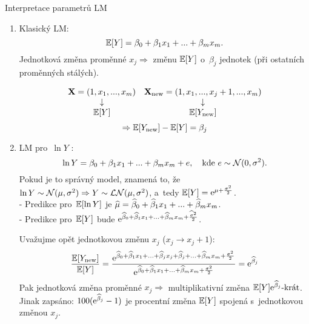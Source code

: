 \begin{remark}
Interpretace parametrů LM

\begin{enumerate}
\item Klasický LM:
 $$
 \mathbb{E} [Y] = \beta_0 + \beta_1 x_1 +... + \beta_m x_m.
 $$
Jednotková změna proměnné $x_j \Rightarrow$ změnu $\mathbb{E} [Y]$ o~$\beta_j$ jednotek (při ostatních proměnných stálých).

 $$
\begin{matrix}
\mathbf{X} = (1,x_1,...,x_m) & \mathbf{X}_{\text{new}} = (1,x_1,...,x_j+1,...,x_m) \\
\downarrow &  \downarrow \\
\mathbb{E} [Y] & \mathbb{E} [Y_{\text{new}}] \\
\end{matrix}
 $$
 \vspace{0.3cm}
 $$ \Rightarrow \mathbb{E} [Y_{\text{new}}] - \mathbb{E} [Y] = \beta_j $$
\item LM pro~$\ln Y$ :
 $$
 \ln Y = \beta_0 + \beta_1 x_1 +... + \beta_m x_m + e, \quad \text{kde } e \sim \mathcal{N}(0,\sigma^2).
 $$
Pokud je to správný model, znamená to, že $\ln Y \sim \mathcal{N}(\mu,\sigma^2) \Rightarrow Y \sim \mathcal{LN}(\mu,\sigma^2)$, a~tedy $\mathbb{E}[Y] = \mathrm{e}^{\mu + \frac{\sigma^2}{2}}$. \\
- Predikce pro~$\mathbb{E} [\ln Y]$ je $\widehat{\mu} = \widehat{\beta}_0 + \widehat{\beta}_1 x_1 +... + \widehat{\beta}_m x_m$. \\
- Predikce pro~$\mathbb{E} [Y]$ bude $\mathrm{e}^{\widehat{\beta}_0 + \widehat{\beta}_1 x_1 +... + \widehat{\beta}_m x_m + \frac{\widehat{\sigma}^2}{2}}$.

Uvažujme opět jednotkovou změnu $x_j$ ($x_j \rightarrow x_j + 1$):
 $$
\frac{ \mathbb{E} [Y_{\text{new}}]}{\mathbb{E} [Y]} = \frac{\mathrm{e}^{\widehat{\beta}_0 + \widehat{\beta}_1 x_1 +... + \widehat{\beta}_j x_j + \widehat{\beta}_j +... + \widehat{\beta}_m x_m + \frac{\sigma^2}{2}}}{\mathrm{e}^{\widehat{\beta}_0 + \widehat{\beta}_1 x_1 +... + \widehat{\beta}_m x_m + \frac{\sigma^2}{2}}} = \mathrm{e}^{\widehat{\beta}_j}
 $$
Pak jednotková změna proměnné $x_j \Rightarrow$ multiplikativní změna $\mathbb{E} [Y] \mathrm{e}^{\widehat{\beta}_j}\text{-krát}$. Jinak zapsáno: $100(\mathrm{e}^{\widehat{\beta}_j}-1)$ je procentní změna $\mathbb{E} [Y]$ spojená s~jednotkovou změnou $x_j$.
\end{enumerate}
\end{remark}

